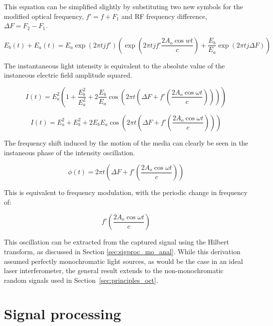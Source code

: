 This equation can be simplified slightly by substituting two new symbols for the modified optical frequency, $f' = f + F_1$ and RF frequency difference, $\Delta F = F_2 - F_1$.

\begin{dmath}
E_b(t) + E_a(t) = E_a \exp{(2 \pi t j f')}\left(\exp{\left(2 \pi t j f' \frac{ 2 A_o \cos{wt}}{c}\right)} + \frac{E_b}{E_a} \exp{(2 \pi t j \Delta F)}\right)
\end{dmath}

The instantaneous light intensity is equivalent to the absolute value of the instaneous electric field amplitude squared.

\begin{dmath}
I(t) = E_a^2 \left(1 + \frac{E_b^2}{E_a^2} + 2 \frac{E_b}{E_a} \cos{\left(2 \pi t \left(\Delta F + f' \left( \frac{2 A_o \cos{\omega t}}{c} \right) \right)\right)} \right)
\end{dmath}

\begin{dmath}
I(t) = E_a^2 + E_b^2 + 2 E_b E_a \cos{\left(2 \pi t \left(\Delta F + f' \left( \frac{2 A_o \cos{\omega t}}{c} \right)  \right)\right)}
\end{dmath}

The frequency shift induced by the motion of the media can clearly be seen in the instaneous phase of the intensity oscillation.

\begin{dmath}
\label{eq:phase_aom_doppler}
\phi(t) = 2 \pi t \left(\Delta F + f' \left( \frac{2 A_o \cos{\omega t}}{c} \right)   \right)
\end{dmath}

This is equivalent to frequency modulation, with the periodic change in frequency of:

\begin{equation}
f' \left( \frac{2 A_o \cos{\omega t}}{c} \right)
\end{equation}

This oscillation can be extracted from the captured signal using the Hilbert transform, as discussed in Section \ref{sec:sigproc_mo_anal}. While this derivation assumed perfectly monochromatic light sources, as would be the case in an ideal laser interferometer, the general result extends to the non-monochromatic random signals used in Section~\ref{sec:principles_oct}.

\section{Signal processing}

